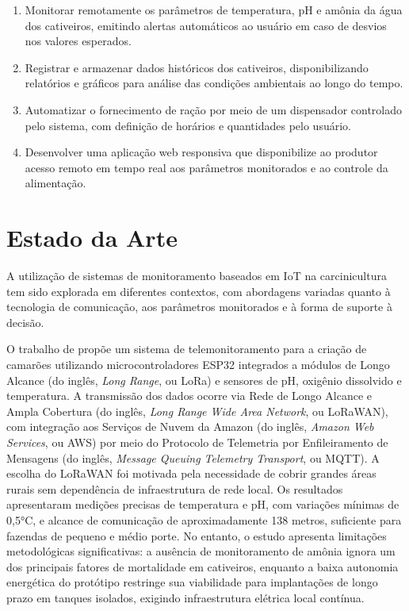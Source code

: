 \documentclass[11pt,a4paper]{article}
\begin{document}
\begin{enumerate}
    \item Monitorar remotamente os parâmetros de temperatura, pH e amônia da água dos cativeiros, emitindo alertas automáticos ao usuário em caso de desvios nos valores esperados.

    \item Registrar e armazenar dados históricos dos cativeiros, disponibilizando relatórios e gráficos para análise das condições ambientais ao longo do tempo.

    \item Automatizar o fornecimento de ração por meio de um dispensador controlado pelo sistema, com definição de horários e quantidades pelo usuário.
    
    \item Desenvolver uma aplicação web responsiva que disponibilize ao produtor acesso remoto em tempo real aos parâmetros monitorados e ao controle da alimentação.

\end{enumerate}

\section{Estado da Arte}

A utilização de sistemas de monitoramento baseados em IoT na carcinicultura tem sido explorada em diferentes contextos, com abordagens variadas quanto à tecnologia de comunicação, aos parâmetros monitorados e à forma de suporte à decisão.

O trabalho de \cite{dantas2020} propõe um sistema de telemonitoramento para a criação de camarões utilizando microcontroladores ESP32 integrados a módulos de Longo Alcance (do inglês, \textit{Long Range}, ou LoRa) e sensores de pH, oxigênio dissolvido e temperatura. A transmissão dos dados ocorre via Rede de Longo Alcance e Ampla Cobertura (do inglês, \textit{Long Range Wide Area Network}, ou LoRaWAN), com integração aos Serviços de Nuvem da Amazon (do inglês, \textit{Amazon Web Services}, ou AWS) por meio do Protocolo de Telemetria por Enfileiramento de Mensagens (do inglês, \textit{Message Queuing Telemetry Transport}, ou MQTT). A escolha do LoRaWAN foi motivada pela necessidade de cobrir grandes áreas rurais sem dependência de infraestrutura de rede local. Os resultados apresentaram medições precisas de temperatura e pH, com variações mínimas de 0,5°C, e alcance de comunicação de aproximadamente 138 metros, suficiente para fazendas de pequeno e médio porte. No entanto, o estudo apresenta limitações metodológicas significativas: a ausência de monitoramento de amônia ignora um dos principais fatores de mortalidade em cativeiros, enquanto a baixa autonomia energética do protótipo restringe sua viabilidade para implantações de longo prazo em tanques isolados, exigindo infraestrutura elétrica local contínua.
\end{document}
